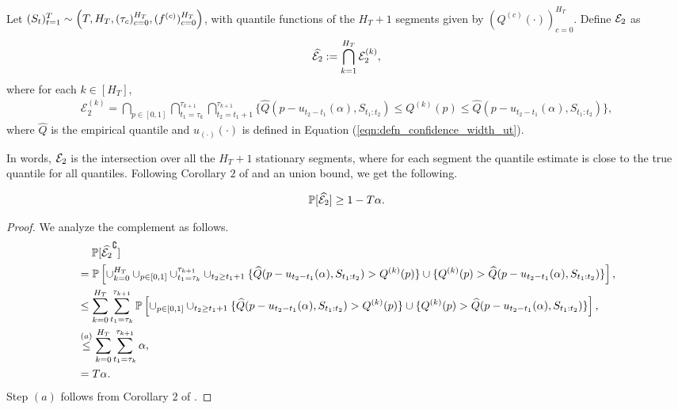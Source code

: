 \begin{definition} 
Let $(S_t)_{t=1}^T \sim \Bigl(T,H_T, (\tau_c)_{c=0}^{H_T}, (f^{(c)})_{c=0}^{H_T}\Bigr)$, with quantile functions of the $H_T+1$ segments given by $(Q^{(c)}(\cdot))_{c=0}^{H_T}$. Define ${\mathcal{E}}_2$ as
\begin{align}
    \widehat{{\mathcal{E}}_2} := \bigcap_{k=1}^{H_T} {\mathcal{E}}_2^{(k)},
    \label{eqn:good_event_2_defn_internal}
\end{align}
where for each $k \in [H_T]$, 
\begin{align*}
        \mathcal{E}_2^{(k)} =  \bigcap_{p \in [0,1]} \bigcap_{t_1 = \tau_{k}}^{\tau_{k+1}} \bigcap_{t_2 = t_1 +1}^{\tau_{k+1}}   \bigg\{ \widehat{Q}(p-u_{t_2 - t_1}(\alpha), S_{t_1:t_2})  \leq Q^{(k)}(p) \leq \widehat{Q}(p-u_{t_2 - t_1}(\alpha), S_{t_1:t_2}) \bigg\},
\end{align*}
where $\widehat{Q}$ is the empirical quantile and $u_{(\cdot)}(\cdot)$ is defined in Equation (\ref{eqn:defn_confidence_width_ut}).
\label{as:goodevent2}
\end{definition}
%
In words,  ${\mathcal{E}}_2$ is the intersection over all the $H_T+1$ stationary segments, where for each segment the quantile estimate is close to the true quantile for all quantiles. Following Corollary $2$ of \cite{howard2022sequential} and an union bound, we get the following.

\begin{proposition}
    \begin{align*}
        \mathbb{P}[\widehat{{\mathcal{E}}_2}] \geq 1 - T\alpha.
    \end{align*}
    \label{prop:good_event_2_prob_hat}
\end{proposition}
\begin{proof}
    We analyze the complement as follows.
    \begin{align*}
        & \quad \; \mathbb{P}[\widehat{{\mathcal{E}}_2}^{\complement}] \\ &= \mathbb{P} \left[ \cup_{k=0}^{H_T} \cup_{p \in [0,1]} \cup_{t_1=\tau_k}^{\tau_{k+1}} \cup_{t_2 \geq t_1 + 1} \{ \widehat{Q}(p-u_{t_2 - t_1}(\alpha), S_{t_1:t_2})  > Q^{(k)}(p) \} \cup \{ Q^{(k)}(p) > \widehat{Q}(p-u_{t_2 - t_1}(\alpha), S_{t_1:t_2}) \}  \right], \\
        &\leq \sum_{k=0}^{H_T} \sum_{t_1=\tau_k}^{\tau_{k+1}}\mathbb{P} \left[ \cup_{p \in [0,1]} \cup_{t_2 \geq t_1 + 1} \{ \widehat{Q}(p-u_{t_2 - t_1}(\alpha), S_{t_1:t_2})  > Q^{(k)}(p) \} \cup \{ Q^{(k)}(p) > \widehat{Q}(p-u_{t_2 - t_1}(\alpha), S_{t_1:t_2}) \}  \right], \\
        &\stackrel{(a)}{\leq}\sum_{k=0}^{H_T} \sum_{t_1=\tau_k}^{\tau_{k+1}}\alpha, \\
        &= T \alpha.
    \end{align*}
    Step $(a)$ follows from   Corollary $2$ of \cite{howard2022sequential}.
\end{proof}

